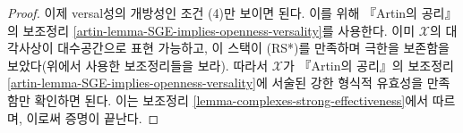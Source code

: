 \begin{proof}
\medskip\noindent
이제 versal성의 개방성인 조건 (4)만 보이면 된다. 이를 위해 『Artin의 공리』의
보조정리 \ref{artin-lemma-SGE-implies-openness-versality}를 사용한다. 이미
$\mathcal{X}$의 대각사상이 대수공간으로 표현 가능하고, 이 스택이 (RS*)를
만족하며 극한을 보존함을 보았다(위에서 사용한 보조정리들을 보라). 따라서
$\mathcal{X}$가 『Artin의 공리』의 보조정리
\ref{artin-lemma-SGE-implies-openness-versality}에 서술된 강한 형식적 유효성을
만족함만 확인하면 된다. 이는 보조정리
\ref{lemma-complexes-strong-effectiveness}에서 따르며, 이로써 증명이 끝난다.
\end{proof}

















